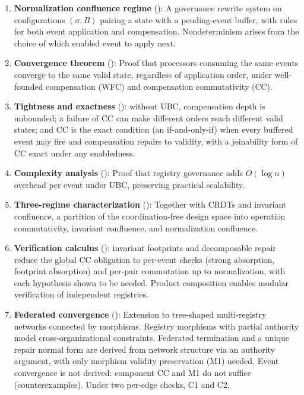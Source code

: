\documentclass[11pt,a4paper]{article}
\theoremstyle{plain}
\theoremstyle{definition}
\theoremstyle{remark}
\renewcommand{\_}{\textunderscore\allowbreak}
\begin{document}
\begin{enumerate}[leftmargin=*,nosep]
\item \textbf{Normalization confluence regime} (): A
  governance rewrite system on configurations $(\sigma, B)$ pairing a state
  with a pending-event buffer, with rules for both event application and
  compensation.  Nondeterminism arises from the choice of which enabled event
  to apply next.
\item \textbf{Convergence theorem} (): Proof that
  processors consuming the same events converge to the same valid state,
  regardless of application order, under well-founded compensation (WFC) and
  compensation commutativity (CC).
\item \textbf{Tightness and exactness} (): without UBC,
  compensation depth is unbounded; a failure of CC can make different orders
  reach different valid states; and CC is the exact condition (an
  if-and-only-if) when every buffered event may fire and compensation repairs
  to validity, with a joinability form of CC exact under any enabledness.
\item \textbf{Complexity analysis} (): Proof that
  registry governance adds $O(\log n)$ overhead per event under UBC,
  preserving practical scalability.
\item \textbf{Three-regime characterization} ():
  Together with CRDTs and invariant confluence, a partition of the
  coordination-free design space into operation commutativity, invariant
  confluence, and normalization confluence.
\item \textbf{Verification calculus} (): invariant
  footprints and decomposable repair reduce the global CC obligation to
  per-event checks (strong absorption, footprint absorption) and per-pair
  commutation up to normalization, with each hypothesis shown to be needed.
  Product composition enables modular verification of independent
  registries.
\item \textbf{Federated convergence} (): Extension to
  tree-shaped multi-registry networks connected by morphisms.  Registry
  morphisms with partial authority model cross-organizational constraints.
  Federated termination and a unique repair normal form are derived from
  network structure via an authority argument, with only morphism validity
  preservation (M1) needed.  Event convergence is not derived: component CC
  and M1 do not suffice (counterexamples).  Under two per-edge checks, C1 and C2,

\end{enumerate}
\end{document}
